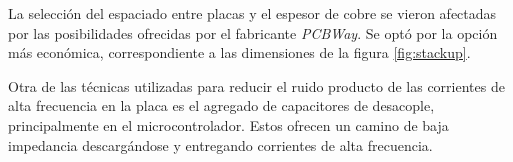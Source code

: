 







La selección del espaciado entre placas y el espesor de cobre se vieron afectadas por las posibilidades ofrecidas por el fabricante \textit{PCBWay}. Se optó por la opción más económica, correspondiente a las dimensiones de la figura \ref{fig:stackup}.


Otra de las técnicas utilizadas para reducir el ruido producto de las corrientes de alta frecuencia en la placa es el agregado de capacitores de desacople, principalmente en el microcontrolador. Estos ofrecen un camino de baja impedancia descargándose y entregando corrientes de alta frecuencia.

